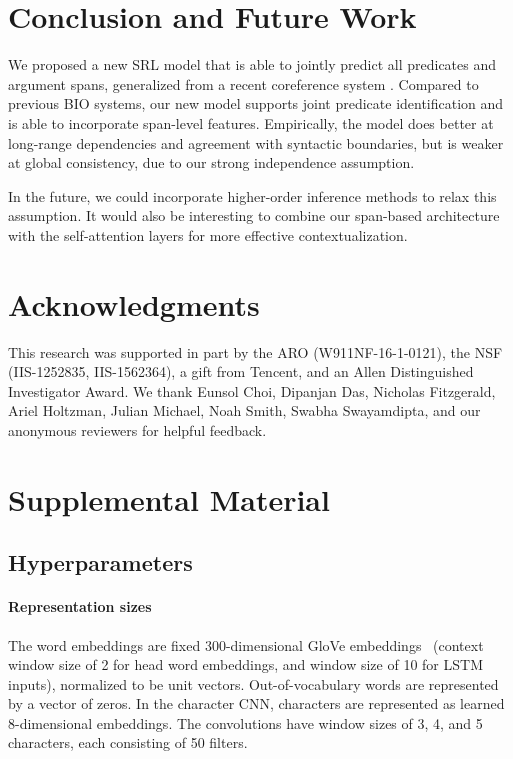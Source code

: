 \documentclass[11pt,a4paper]{article}
\begin{document}
 
 \section{Conclusion and Future Work}
We proposed a new SRL model that is able to jointly predict all predicates and argument spans, generalized from a recent coreference system \cite{Lee2017EndtoendNC}. Compared to previous BIO systems, our new model supports joint predicate identification and is able to incorporate span-level features. Empirically, the model does better at long-range dependencies and agreement with syntactic boundaries, but is weaker at global consistency, due to our strong independence assumption. 

In the future, we could incorporate higher-order inference methods \cite{lee2018higher} to relax this assumption. It would also be interesting to combine our span-based architecture with the self-attention layers \cite{tan2018deep,strubell2018linguistically} for more effective contextualization.
 
\section*{Acknowledgments}

This research was supported in part by the ARO (W911NF-16-1-0121), the NSF  (IIS-1252835,  IIS-1562364), a gift from Tencent, and an Allen Distinguished Investigator Award. We thank Eunsol Choi, Dipanjan Das, Nicholas Fitzgerald, Ariel Holtzman, Julian Michael, Noah Smith, Swabha Swayamdipta, and our anonymous reviewers for helpful feedback. 







\appendix
\section{Supplemental Material}
\label{sec:supplemental}
\subsection{Hyperparameters}

\paragraph{Representation sizes}
The word embeddings are fixed 300-dimensional GloVe embeddings~\cite{Pennington2014GloveGV} (context window size of 2 for head word embeddings, and window size of 10 for LSTM inputs), normalized to be unit vectors. 
Out-of-vocabulary words are represented by a vector of zeros. In the character CNN, characters are represented as learned 8-dimensional embeddings. The convolutions have window sizes of 3, 4, and 5 characters, each consisting of 50 filters.
\end{document}
